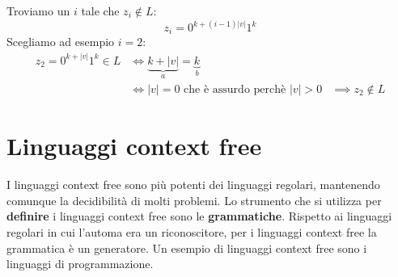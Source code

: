 \documentclass[a4paper]{article}
\begin{document}
\begin{example}
  \vspace{1em}
  \noindent
  Troviamo un \( i \) tale che \( z_i \notin L \):
  \[
    z_i = 0^{k + (i-1)|v|} 1^k
  \] 
  Scegliamo ad esempio \( i = 2 \):
  \[
    \begin{aligned}
      z_2 = 0^{k + |v|} 1^k \in L &\iff \underbrace{k + |v|}_a = \underbrace{k}_b\\
                                  &\iff |v| = 0 \text{ che è assurdo perchè } |v| > 0
                                  &\implies z_2 \notin L
    \end{aligned}
  \] 
\end{example}

\section{Linguaggi context free}
I linguaggi context free sono più potenti dei linguaggi regolari, mantenendo comunque
la decidibilità di molti problemi. Lo strumento che si utilizza per \textbf{definire} i linguaggi
context free sono le \textbf{grammatiche}. Rispetto ai linguaggi regolari in cui l'automa
era un riconoscitore, per i linguaggi context free la grammatica è un generatore.
Un esempio di linguaggi context free sono i linguaggi di programmazione.
\end{document}
